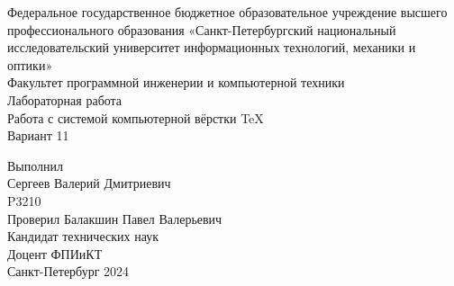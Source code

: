 \thispagestyle{empty}
{\Large 
\begin{center}
    Федеральное государственное бюджетное образовательное учреждение высшего профессионального образования 
    «Санкт-Петербургский национальный исследовательский университет информационных технологий, механики и оптики»\\
    \vspace{1em}
    Факультет программной инженерии и компьютерной техники\\
    \vspace{8em}
    Лабораторная работа \\%
    Работа с системой компьютерной вёрстки TeX\\%
    Вариант 11
\end{center}
\vspace{8em}
\begin{flushright}
    Выполнил\\
    Сергеев Валерий Дмитриевич\\
    P3210\\
    Проверил 
    Балакшин Павел Валерьевич\\
    Кандидат технических наук\\
    Доцент ФПИиКТ\\
    Санкт-Петербург 2024\\
\end{flushright}
}

